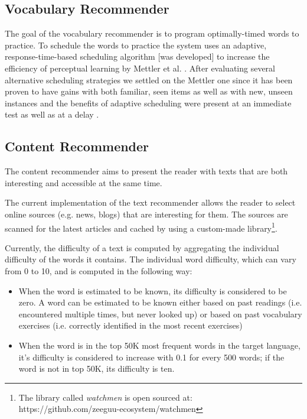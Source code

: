 
\subsection{Vocabulary Recommender}

The goal of the vocabulary recommender is to program optimally-timed words to practice. 
% 
To schedule the words to practice the system uses an adaptive, response-time-based scheduling algorithm [was developed] to increase the efficiency of perceptual learning by Mettler et al. \cite{Mettler14-ARTS}. After evaluating several alternative scheduling strategies we settled on the Mettler one since it has been proven to have gains with both familiar, seen items as well as with new, unseen instances and the benefits of adaptive scheduling were present at an immediate test as well as at a delay \cite{Mettler14-ARTS}.


\subsection{Content Recommender}

The content recommender aims to present the reader with texts that are both interesting and accessible at the same time.

The current implementation of the text recommender allows the reader to select online sources (e.g. news, blogs) that are interesting for them. The sources are scanned for the latest articles and cached by using a custom-made library\footnote{The library called {\em watchmen} is open sourced at:\\ https://github.com/zeeguu-ecosystem/watchmen}. 

Currently, the difficulty of a text is computed by aggregating the individual difficulty of the words it contains. The individual word difficulty, which can vary from 0 to 10, and is computed in the following way: 

\begin{itemize}
	\item When the word is estimated to be known, its difficulty is considered to be zero. A word can be estimated to be known either based on past readings (i.e. encountered multiple times, but never looked up) or based on past vocabulary exercises (i.e. correctly identified in the most recent exercises) 
	\item When the word is in the top 50K most frequent words in the target language, it's difficulty is 	considered to increase with 0.1 for every 500 words; if the word is not in top 50K, its difficulty is ten.
\end{itemize}

